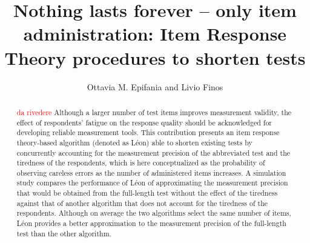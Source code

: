 \documentclass{svproc}
\newcommand{\ottavia}[1]{\textcolor{red}{#1}}
\begin{document}
\mainmatter              %
%
\title{Nothing lasts forever -- only item administration: Item Response Theory procedures to shorten tests}
%
%
\author{Ottavia M. Epifania and Livio Finos}
%
%
%

\maketitle              %

\begin{abstract}
\ottavia{da rivedere}
Although a larger number of test items improves measurement validity, the effect of respondents’ fatigue on the response quality should be acknowledged for developing reliable measurement tools.  This contribution presents an item response theory-based algorithm (denoted as Léon) able to shorten existing tests by concurrently accounting for the measurement precision of the abbreviated test and the tiredness of the respondents, which is here conceptualized as the probability of observing careless errors as the number of administered items increases. A simulation study compares the performance of Léon of approximating the measurement precision that would be obtained from the full-length test without the effect of the tiredness against that of another algorithm that does not account for the tiredness of the respondents. Although on average the two algorithms select the same number of items, Léon provides a better approximation to the measurement precision of the full-length test than the other algorithm.  
\end{abstract}
%
\end{document}
